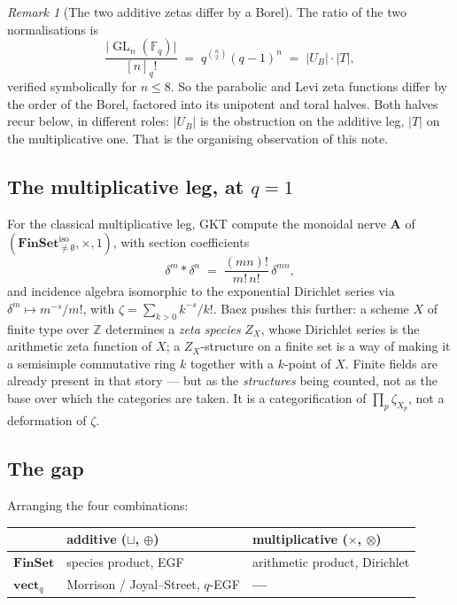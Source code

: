 \documentclass[11pt,a4paper]{article}
\theoremstyle{definition}
\theoremstyle{remark}
\newtheorem{remark}[theorem]{Remark}
\newcommand{\FF}{\mathbb{F}}
\newcommand{\ZZ}{\mathbb{Z}}
\newcommand{\cat}[1]{\mathbf{#1}}
\newcommand{\FinSet}{\cat{FinSet}}
\newcommand{\vect}{\cat{vect}}
\DeclareMathOperator{\GL}{GL}
\newcommand{\norm}[1]{\lvert #1 \rvert}
\newcommand{\iso}{\mathrm{iso}}
\begin{document}
\begin{remark}[The two additive zetas differ by a Borel]
The ratio of the two normalisations is
\[
  \frac{\norm{\GL_n(\FF_q)}}{[n]_q!} \;=\; q^{\binom{n}{2}}(q-1)^n
  \;=\; \norm{U_B}\cdot\norm{T},
\]
verified symbolically for $n \le 8$. So the parabolic and Levi zeta functions differ by
the order of the Borel, factored into its unipotent and toral halves. Both halves recur
below, in different roles: $\norm{U_B}$ is the obstruction on the additive leg, $\norm{T}$
on the multiplicative one. That is the organising observation of this note.
\end{remark}

\subsection{The multiplicative leg, at \texorpdfstring{$q=1$}{q=1}}

For the classical multiplicative leg, GKT compute the monoidal nerve $\cat{A}$ of
$(\FinSet^{\iso}_{\neq\emptyset},\times,1)$, with section coefficients
\[
  \delta^m * \delta^n \;=\; \frac{(mn)!}{m!\,n!}\,\delta^{mn},
\]
and incidence algebra isomorphic to the exponential Dirichlet series via $\delta^m \mapsto
m^{-s}/m!$, with $\zeta = \sum_{k>0} k^{-s}/k!$. Baez \cite{Baez2025} pushes this further:
a scheme $X$ of finite type over $\ZZ$ determines a \emph{zeta species} $Z_X$, whose
Dirichlet series is the arithmetic zeta function of $X$; a $Z_X$-structure on a finite set
is a way of making it a semisimple commutative ring $k$ together with a $k$-point of $X$.
Finite fields are already present in that story --- but as the \emph{structures} being
counted, not as the base over which the categories are taken. It is a categorification of
$\prod_p \zeta_{X_p}$, not a deformation of $\zeta$.

\subsection{The gap}

Arranging the four combinations:

\begin{center}
\begin{tabular}{@{}lll@{}}
\toprule
 & additive ($\sqcup$, $\oplus$) & multiplicative ($\times$, $\otimes$) \\
\midrule
$\FinSet$ & species product, EGF & arithmetic product, Dirichlet \\
$\vect_q$ & Morrison / Joyal--Street, $q$-EGF & \textbf{---} \\
\bottomrule
\end{tabular}
\end{center}
\end{document}

